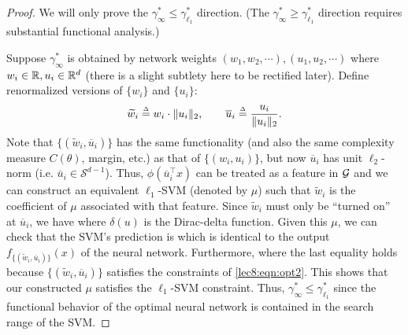 \begin{proof}

We will only prove the $\gamma_{\infty}^* \leq \gamma_{\ell_1}^*$ direction. (The $\gamma_{\infty}^* \geq \gamma_{\ell_1}^*$ direction requires substantial functional analysis.)

Suppose $\gamma_\infty^*$ is obtained by network weights $(w_1,w_2, \cdots), (u_1, u_2, \cdots)$ where $w_i\in \mathbb R, u_i\in \mathbb R^d$ (there is a slight subtlety here to be rectified later). Define renormalized versions of $\{w_i\}$ and $\{u_i\}$:
\begin{equation}
\widetilde w_i \defeq w_i\cdot \norm{u_i}_2, \qquad \overline u_i \defeq \frac {u_i} {\norm{u_i}_2}.   
\end{equation}
Note that $\{(\widetilde w_i, \overline u_i)\}$ has the same functionality (and also the same complexity measure $C(\theta)$, margin, etc.) as that of $\{(w_i,u_i)\}$, but now $\overline u_i$ has unit $\ell_2$-norm (i.e. $\bar{u}_i \in \mathcal{S}^{d-1}$). Thus, $\phi(\overline u_i ^\top x)$ can be treated as a feature in $\mathcal G$ and we can construct an equivalent $\ell_1$-SVM (denoted by $\mu$) such that $\widetilde w_i$ is the coefficient of $\mu$ associated with that feature. Since $\widetilde w_i$ must only be ``turned on'' at $\overline u_i $, we have 
where $ \delta(u)$ is the Dirac-delta function. Given this $\mu$, we can check that the SVM's prediction is
which is identical to the output $f_{\{(\widetilde w_i, \overline u_i)\}}(x)$ of the neural network. Furthermore, 
where the last equality holds because $\{(\widetilde w_i, \overline u_i)\}$ satisfies the constraints of \eqref{lec8:eqn:opt2}. This shows that our constructed $\mu$ satisfies the $\ell_1$-SVM constraint. Thus, $\gamma_{\infty}^* \leq \gamma_{\ell_1}^*$ since the functional behavior of the optimal neural network is contained in the search range of the SVM.

\end{proof}

